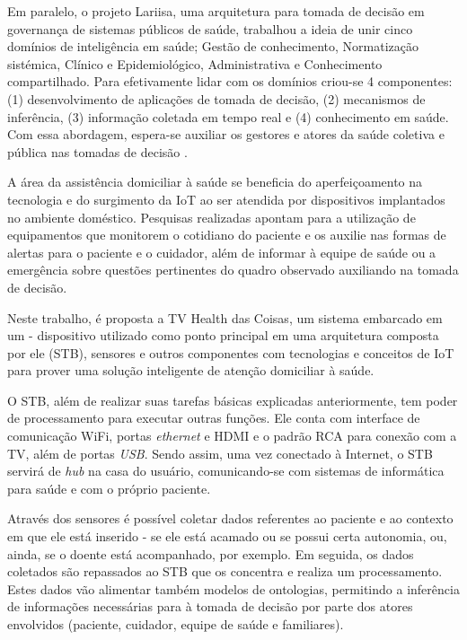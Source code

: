 Em paralelo, o projeto Lariisa, uma arquitetura para tomada de decisão em governança
de sistemas públicos de saúde, trabalhou a ideia de unir cinco domínios de inteligência
em saúde; Gestão de conhecimento, Normatização sistémica, Clínico e Epidemiológico,
Administrativa e Conhecimento compartilhado. Para efetivamente lidar com os domínios
criou-se 4 componentes: (1) desenvolvimento de aplicações de tomada de decisão, (2) 
mecanismos de inferência, (3) informação coletada em tempo real e (4) conhecimento em 
saúde. Com essa abordagem, espera-se auxiliar os gestores e atores da saúde coletiva 
e pública nas tomadas de decisão \cite{oliveira2010context}.

A área da assistência domiciliar à saúde se beneficia do aperfeiçoamento na
tecnologia e do surgimento da IoT ao ser atendida por dispositivos implantados
no ambiente doméstico.  Pesquisas realizadas \cite{triantafyllidis2013,moreira2016} 
apontam para a utilização de equipamentos que monitorem o cotidiano do paciente
e os auxilie nas formas de alertas para o paciente e o cuidador, além de
informar à equipe de saúde ou a emergência sobre questões pertinentes do quadro 
observado auxiliando na tomada de decisão.

Neste trabalho, é proposta a TV Health das Coisas, um sistema embarcado em um
\stb[] - dispositivo utilizado como ponto principal em uma arquitetura composta
por ele (STB), sensores e outros componentes com tecnologias e conceitos de IoT
para  prover uma solução inteligente de atenção domiciliar à saúde.

O STB, além de realizar suas tarefas básicas explicadas anteriormente, tem poder
de processamento para executar outras funções. Ele conta com interface de
comunicação WiFi, portas \textit{ethernet} e HDMI e o padrão RCA para
conexão com a TV, além de portas \textit{USB}. Sendo assim, uma vez conectado à
Internet, o STB servirá de \textit{hub} na casa do usuário, comunicando-se
com sistemas de informática para saúde e com o próprio paciente.

Através dos sensores é possível coletar dados referentes ao paciente e ao
contexto em que ele está inserido - se ele está acamado ou se
possui certa autonomia, ou, ainda, se o doente está acompanhado, por exemplo.  Em seguida, os
dados coletados são repassados ao STB que  os concentra e realiza um
processamento. Estes dados vão alimentar também modelos de ontologias, 
permitindo a inferência de informações necessárias para à tomada de decisão
por parte dos atores  envolvidos (paciente, cuidador, equipe de saúde e 
familiares). 

